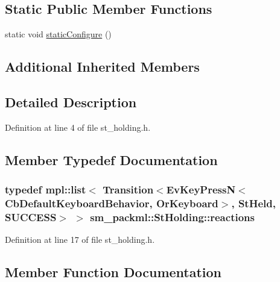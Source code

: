 \subsection*{Static Public Member Functions}
\begin{DoxyCompactItemize}
\item 
static void \hyperlink{structsm__packml_1_1StHolding_a22319b4c87a56cbaa2e3baefd6c2f035}{static\+Configure} ()
\end{DoxyCompactItemize}
\subsection*{Additional Inherited Members}


\subsection{Detailed Description}


Definition at line 4 of file st\+\_\+holding.\+h.



\subsection{Member Typedef Documentation}
\subsubsection[{\texorpdfstring{reactions}{reactions}}]{\setlength{\rightskip}{0pt plus 5cm}typedef mpl\+::list$<$ Transition$<$Ev\+Key\+PressN$<$Cb\+Default\+Keyboard\+Behavior, {\bf Or\+Keyboard}$>$, {\bf St\+Held}, {\bf S\+U\+C\+C\+E\+SS}$>$ $>$ {\bf sm\+\_\+packml\+::\+St\+Holding\+::reactions}}\hypertarget{structsm__packml_1_1StHolding_af6f29cea0ce7bbcc1b4b9faf61809791}{}\label{structsm__packml_1_1StHolding_af6f29cea0ce7bbcc1b4b9faf61809791}


Definition at line 17 of file st\+\_\+holding.\+h.



\subsection{Member Function Documentation}
